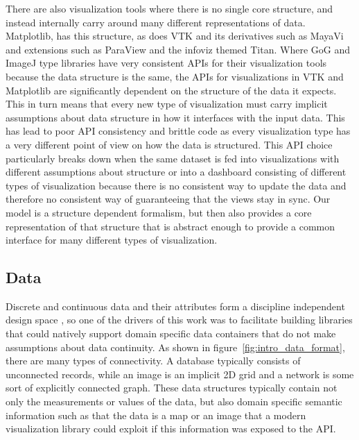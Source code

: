 \documentclass[../main.tex]{subfiles}
\begin{document}
There are also visualization tools where there is no single core structure, and instead internally carry around many different representations of data. Matplotlib, has this structure, as does VTK \cite{hanwellVisualizationToolkitVTK2015,geveci2012vtk} and its derivatives such as MayaVi\cite{ramachandranMayaVi2011} and extensions such as ParaView\cite{ahrens2005paraview} and the infoviz themed Titan\cite{brianwylieUnifiedToolkitInformation2009}. Where GoG and ImageJ type libraries have very consistent APIs for their visualization tools because the data structure is the same, the APIs for visualizations in VTK and Matplotlib are significantly dependent on the structure of the data it expects. This in turn means that every new type of visualization must carry implicit assumptions about data structure in how it interfaces with the input data. This has lead to poor API consistency and brittle code as every visualization type has a very different point of view on how the data is structured. This API choice particularly breaks down when the same dataset is fed into visualizations with different assumptions about structure or into a dashboard consisting of different types of visualization\cite{a.sarikayaWhatWeTalk2019,fewDashboardConfusionRevisited2007} because there is no consistent way to update the data and therefore no consistent way of guaranteeing that the views stay in sync. Our model is a structure dependent formalism, but then also provides a core representation of that structure that is abstract enough to provide a common interface for many different types of visualization.

\subsection{Data}
\label{sec:intro_data}
Discrete and continuous data and their attributes form a discipline independent design space \cite{pousmanCasualInformation2007}, so one of the drivers of this work was to facilitate building libraries that could natively support domain specific data containers that do not make assumptions about data continuity. As shown in figure~\ref{fig:intro_data_format}, there are many types of connectivity. A database typically consists of unconnected records, while an image is an implicit 2D grid and a network is some sort of explicitly connected graph. These data structures typically contain not only the measurements or values of the data, but also domain specific semantic information such as that the data is a map or an image that a modern visualization library could exploit if this information was exposed to the API. 
\end{document}
